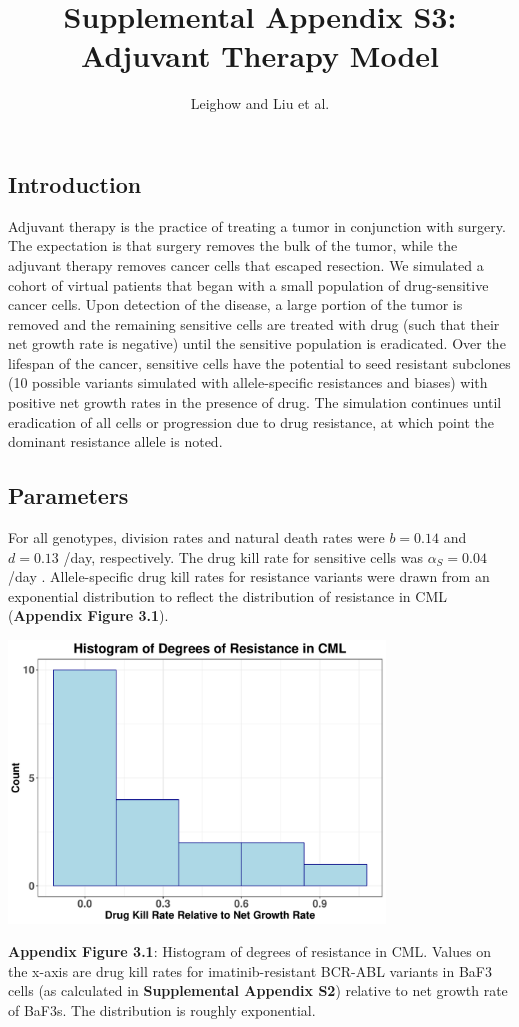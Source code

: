 \documentclass{article}
\title{Supplemental Appendix S3: \\
\large Adjuvant Therapy Model}
\author{Leighow and Liu et al.}
\begin{document}
\maketitle


\subsection{Introduction}
Adjuvant therapy is the practice of treating a tumor in conjunction with surgery. The expectation is that surgery removes the bulk of the tumor, while the adjuvant therapy removes cancer cells that escaped resection.  We simulated a cohort of virtual patients that began with a small population of drug-sensitive cancer cells. Upon detection of the disease, a large portion of the tumor is removed and the remaining sensitive cells are treated with drug (such that their net growth rate is negative) until the sensitive population is eradicated.  Over the lifespan of the cancer, sensitive cells have the potential to seed resistant subclones (10 possible variants simulated with allele-specific resistances and biases) with positive net growth rates in the presence of drug.  The simulation continues until eradication of all cells or progression due to drug resistance, at which point the dominant resistance allele is noted.

\subsection{Parameters}
For all genotypes, division rates and natural death rates were $b = 0.14$ and $d = 0.13$ /day, respectively.  The drug kill rate for sensitive cells was $\alpha_S=0.04$ /day \cite{1}.  Allele-specific drug kill rates for resistance variants were drawn from an exponential distribution to reflect the distribution of resistance in CML (\textbf{Appendix Figure 3.1}).

\begin{center}
\includegraphics[width=0.75\textwidth]{CMLResistanceHistogram}

\textbf{Appendix Figure 3.1}: Histogram of degrees of resistance in CML.  Values on the x-axis are drug kill rates for imatinib-resistant BCR-ABL variants in BaF3 cells (as calculated in \textbf{Supplemental Appendix S2}) relative to net growth rate of BaF3s.  The distribution is roughly exponential.
\end{center}
\end{document}
